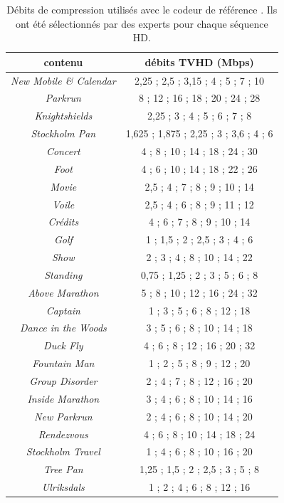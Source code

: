 \begin{table}[htbp]
\centering
\begin{tabular}{cc}\toprule
\textbf{contenu}				& \textbf{débits TVHD (Mbps)} \\ \toprule
\emph{New Mobile \& Calendar}	& 2,25 ; 2,5 ; 3,15 ; 4 ; 5 ; 7 ; 10 \\ \midrule
\emph{Parkrun}					& 8 ; 12 ; 16 ; 18 ; 20 ; 24 ; 28 \\ \midrule
\emph{Knightshields}			& 2,25 ; 3 ; 4 ; 5 ; 6 ; 7 ; 8 \\ \midrule
\emph{Stockholm Pan}			& 1,625 ; 1,875 ; 2,25 ; 3 ; 3,6 ; 4 ; 6 \\ \midrule
\emph{Concert}					& 4 ; 8 ; 10 ; 14 ; 18 ; 24 ; 30 \\ \midrule
\emph{Foot}						& 4 ; 6 ; 10 ; 14 ; 18 ; 22 ; 26 \\ \midrule
\emph{Movie}					& 2,5 ; 4 ; 7 ; 8 ; 9 ; 10 ; 14 \\ \midrule
\emph{Voile}					& 2,5 ; 4 ; 6 ; 8 ; 9 ; 11 ; 12 \\ \midrule
\emph{Crédits}					& 4 ; 6 ; 7 ; 8 ; 9 ; 10 ; 14 \\ \midrule
\emph{Golf}						& 1 ; 1,5 ; 2 ; 2,5 ; 3 ; 4 ; 6 \\ \midrule
\emph{Show}						& 2 ; 3 ; 4 ; 8 ; 10 ; 14 ; 22 \\ \midrule
\emph{Standing}					& 0,75 ; 1,25 ; 2 ; 3 ; 5 ; 6 ; 8 \\ \midrule
\emph{Above Marathon}			& 5 ; 8 ; 10 ; 12 ; 16 ; 24 ; 32 \\ \midrule
\emph{Captain}					& 1 ; 3 ; 5 ; 6 ; 8 ; 12 ; 18 \\ \midrule
\emph{Dance in the Woods}		& 3 ; 5 ; 6 ; 8 ; 10 ; 14 ; 18 \\ \midrule
\emph{Duck Fly}					& 4 ; 6 ; 8 ; 12 ; 16 ; 20 ; 32 \\ \midrule
\emph{Fountain Man}				& 1 ; 2 ; 5 ; 8 ; 9 ; 12 ; 20 \\ \midrule
\emph{Group Disorder}			& 2 ; 4 ; 7 ; 8 ; 12 ; 16 ; 20 \\ \midrule
\emph{Inside Marathon}			& 3 ; 4 ; 6 ; 8 ; 10 ; 14 ; 16 \\ \midrule
\emph{New Parkrun}				& 2 ; 4 ; 6 ; 8 ; 10 ; 14 ; 20 \\ \midrule
\emph{Rendezvous}				& 4 ; 6 ; 8 ; 10 ; 14 ; 18 ; 24 \\ \midrule
\emph{Stockholm Travel}			& 1 ; 4 ; 6 ; 8 ; 10 ; 16 ; 20 \\ \midrule
\emph{Tree Pan}					& 1,25 ; 1,5 ; 2 ; 2,5 ; 3 ; 5 ; 8 \\ \midrule
\emph{Ulriksdals}				& 1 ; 2 ; 4 ; 6 ; 8 ; 12 ; 16 \\ \bottomrule
\end{tabular}
\caption{Débits de compression utilisés avec le codeur de référence \avc{}. Ils ont été sélectionnés par des experts pour chaque séquence HD.}
\label{tab:bitratesHD}
\end{table}


